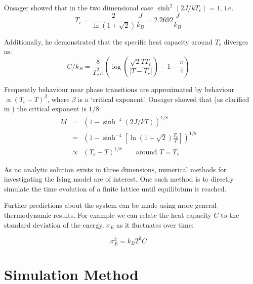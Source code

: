 \documentclass[12pt,a4paper,english]{article}
\begin{document}
Onsager \cite{onsager44} showed that in the two dimensional case $\sinh^2 \left(2J/kT_c\right)=1$, i.e.
\begin{equation}
\label{eq:T-c}
T_c= \frac{2} {\ln \left( 1 + \sqrt{2}\right)} \frac{J}{k_B} = 2.2692 \frac{J}{k_B}
\end{equation}

Additionally, he demonstrated that the specific heat capacity around $T_c$ diverges as:
\begin{equation}
\label{eq:heat-capacity}
C/k_B = \frac{8}{T_c^2 \pi} \left( \log \left( \frac{\sqrt{2}T T_c}{ |T-T_c| } \right) -1 - \frac{\pi}{4} \right)
\end{equation}

Frequently behaviour near phase transitions are approximated by behaviour $\propto \left( T_c - T\right)^\beta$, where $\beta$ is a `critical exponent'. Onsager showed that (as clarified in \cite{montroll63}) the critical exponent is $1/8$:
\begin{eqnarray}
M & = & \left( 1- \sinh^{-4} \left(2J/kT \right) \right)^{1/8} \\
  & = & \left( 1- \sinh^{-4} \left[\ln \left(1+\sqrt{2}\right) \frac{T_c}{T} \right] \right)^{1/8} \\
  & \propto & \left( T_c - T \right)^{1/8} \qquad \textrm{around } T=T_c
\label{eq:critical-exponent}
\end{eqnarray}

As no analytic solution exists in three dimensions, numerical methods for investigating the Ising model are of interest.  One such method is to directly simulate the time evolution of a finite lattice until equilibrium is reached.

\medskip

Further predictions about the system can be made using more general thermodynamic results.  For example we can relate the heat capacity $C$ to the standard deviation of the energy, $\sigma_E$ as it fluctuates over time\cite{rosser82-e-fluc}:

\begin{equation}
\label{eq:e-fluc}
\sigma_E^2=k_B T^2 C
\end{equation}

\section{Simulation Method}
\label{sec:method}
\end{document}
